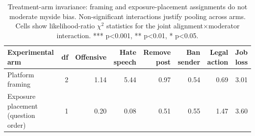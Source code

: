 \begin{table}

\caption{\label{tab:robustness-treatment-arm}Treatment-arm invariance: framing and exposure-placement assignments do not moderate myside bias. Non-significant interactions justify pooling across arms. Cells show likelihood-ratio $\chi^2$ statistics for the joint alignment$\times$moderator interaction. *** p<0.001, ** p<0.01, * p<0.05.}
\centering
\begin{tabular}[t]{lrrrrrrr}
\toprule
\textbf{Experimental arm} & \textbf{df} & \textbf{Offensive} & \textbf{Hate speech} & \textbf{Remove post} & \textbf{Ban sender} & \textbf{Legal action} & \textbf{Job loss}\\
\midrule
Platform framing & 2 & 1.14 & 5.44 & 0.97 & 0.54 & 0.69 & 3.01\\
Exposure placement (question order) & 1 & 0.20 & 0.08 & 0.51 & 0.55 & 1.47 & 3.60\\
\bottomrule
\end{tabular}
\end{table}
